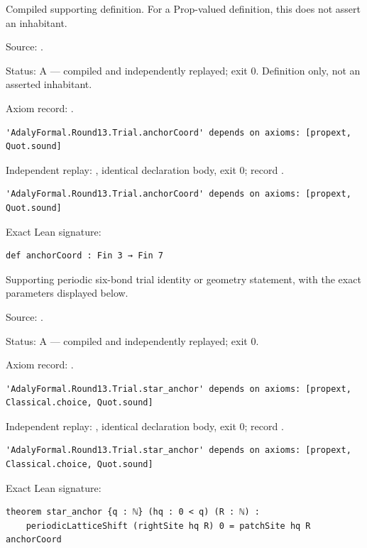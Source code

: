\begin{definition}[bp-396]
\label{bp-396}
\uses{}
\leanok
Compiled supporting definition. For a Prop-valued definition, this does not assert an inhabitant.

\par Source: \texttt{}.
\par Status: A — compiled and independently replayed; exit 0. Definition only, not an asserted inhabitant.
\par Axiom record: \texttt{}.
\begin{verbatim}
'AdalyFormal.Round13.Trial.anchorCoord' depends on axioms: [propext, Quot.sound]
\end{verbatim}
\par Independent replay: \texttt{}, identical declaration body, exit 0; record \texttt{}.
\begin{verbatim}
'AdalyFormal.Round13.Trial.anchorCoord' depends on axioms: [propext, Quot.sound]
\end{verbatim}
\par Exact Lean signature:
\begin{verbatim}
def anchorCoord : Fin 3 → Fin 7
\end{verbatim}
\end{definition}

\begin{theorem}[bp-397]
\label{bp-397}
\leanok
Supporting periodic six-bond trial identity or geometry statement, with the exact parameters displayed below.

\par Source: \texttt{}.
\par Status: A — compiled and independently replayed; exit 0.
\par Axiom record: \texttt{}.
\begin{verbatim}
'AdalyFormal.Round13.Trial.star_anchor' depends on axioms: [propext, Classical.choice, Quot.sound]
\end{verbatim}
\par Independent replay: \texttt{}, identical declaration body, exit 0; record \texttt{}.
\begin{verbatim}
'AdalyFormal.Round13.Trial.star_anchor' depends on axioms: [propext, Classical.choice, Quot.sound]
\end{verbatim}
\par Exact Lean signature:
\begin{verbatim}
theorem star_anchor {q : ℕ} (hq : 0 < q) (R : ℕ) :
    periodicLatticeShift (rightSite hq R) 0 = patchSite hq R anchorCoord
\end{verbatim}
\end{theorem}

